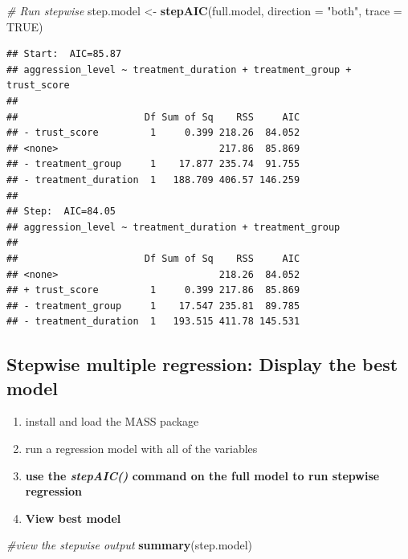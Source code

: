 \documentclass[
]{book}
\newenvironment{Shaded}{\begin{snugshade}}{\end{snugshade}}
\newcommand{\CommentTok}[1]{\textcolor[rgb]{0.56,0.35,0.01}{\textit{#1}}}
\newcommand{\DataTypeTok}[1]{\textcolor[rgb]{0.13,0.29,0.53}{#1}}
\newcommand{\KeywordTok}[1]{\textcolor[rgb]{0.13,0.29,0.53}{\textbf{#1}}}
\newcommand{\NormalTok}[1]{#1}
\newcommand{\OtherTok}[1]{\textcolor[rgb]{0.56,0.35,0.01}{#1}}
\newcommand{\StringTok}[1]{\textcolor[rgb]{0.31,0.60,0.02}{#1}}
\providecommand{\tightlist}{%
  \setlength{\itemsep}{0pt}\setlength{\parskip}{0pt}}
\begin{document}
\begin{Shaded}
\begin{Highlighting}[]
\CommentTok{# Run stepwise}
\NormalTok{step.model <-}\StringTok{ }\KeywordTok{stepAIC}\NormalTok{(full.model, }\DataTypeTok{direction =} \StringTok{"both"}\NormalTok{, }\DataTypeTok{trace =} \OtherTok{TRUE}\NormalTok{)}
\end{Highlighting}
\end{Shaded}

\begin{verbatim}
## Start:  AIC=85.87
## aggression_level ~ treatment_duration + treatment_group + trust_score
## 
##                      Df Sum of Sq    RSS     AIC
## - trust_score         1     0.399 218.26  84.052
## <none>                            217.86  85.869
## - treatment_group     1    17.877 235.74  91.755
## - treatment_duration  1   188.709 406.57 146.259
## 
## Step:  AIC=84.05
## aggression_level ~ treatment_duration + treatment_group
## 
##                      Df Sum of Sq    RSS     AIC
## <none>                            218.26  84.052
## + trust_score         1     0.399 217.86  85.869
## - treatment_group     1    17.547 235.81  89.785
## - treatment_duration  1   193.515 411.78 145.531
\end{verbatim}

\hypertarget{stepwise-multiple-regression-display-the-best-model}{%
\subsection{Stepwise multiple regression: Display the best model}\label{stepwise-multiple-regression-display-the-best-model}}

\begin{enumerate}
\def\labelenumi{\arabic{enumi}.}
\tightlist
\item
  install and load the MASS package
\item
  run a regression model with all of the variables
\item
  \textbf{use the \emph{stepAIC()} command on the full model to run stepwise regression}
\item
  \textbf{View best model}
\end{enumerate}

\begin{Shaded}
\begin{Highlighting}[]
\CommentTok{#view the stepwise output}
\KeywordTok{summary}\NormalTok{(step.model)}
\end{Highlighting}
\end{Shaded}
\end{document}
